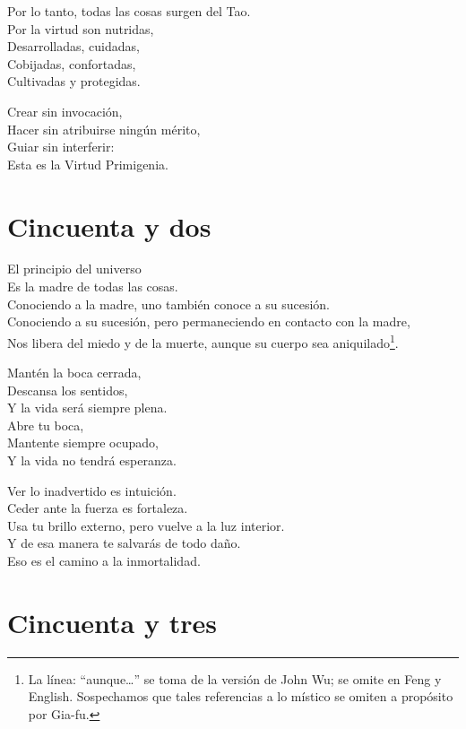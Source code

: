 \documentclass[book,b5paper,hidelinks,final]{memoir}
\begin{document}
	Por lo tanto, todas las cosas surgen del Tao.\\
	Por la virtud son nutridas,\\
	Desarrolladas, cuidadas,\\
	Cobijadas, confortadas,\\
	Cultivadas y protegidas.
	
	Crear sin invocación,\\
	Hacer sin atribuirse ningún mérito,\\
	Guiar sin interferir:\\
	Esta es la Virtud Primigenia.
	
	\chapter*{Cincuenta y dos}
	
	El principio del universo\\
	Es la madre de todas las cosas.\\
	Conociendo a la madre, uno también conoce a su sucesión.\\
	Conociendo a su sucesión, pero permaneciendo en contacto con la madre,\\
	Nos libera del miedo y de la muerte, aunque su cuerpo sea aniquilado\footnote{La línea: ``aunque\ldots'' se toma de la versión de John Wu; se omite en
		Feng y English. Sospechamos que tales referencias a lo místico se omiten
		a propósito por Gia-fu.}.
	
	Mantén la boca cerrada,\\
	Descansa los sentidos,\\
	Y la vida será siempre plena.\\
	Abre tu boca,\\
	Mantente siempre ocupado,\\
	Y la vida no tendrá esperanza.
	
	Ver lo inadvertido es intuición.\\
	Ceder ante la fuerza es fortaleza.\\
	Usa tu brillo externo, pero vuelve a la luz interior.\\
	Y de esa manera te salvarás de todo daño.\\
	Eso es el camino a la inmortalidad.
	
	\chapter*{Cincuenta y tres}
	
\end{document}
